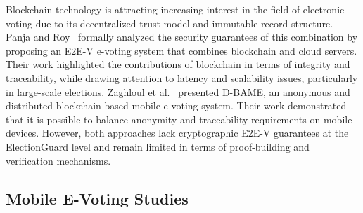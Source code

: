 \documentclass[a4paper,fleqn]{cas-sc}
\begin{document}

Blockchain technology is attracting increasing interest in the field of electronic voting due to its decentralized trust model and immutable record structure. Panja and Roy~\cite{Panja2021} formally analyzed the security guarantees of this combination by proposing an E2E-V e-voting system that combines blockchain and cloud servers. Their work highlighted the contributions of blockchain in terms of integrity and traceability, while drawing attention to latency and scalability issues, particularly in large-scale elections. Zaghloul et al.~\cite{Zaghloul2021} presented D-BAME, an anonymous and distributed blockchain-based mobile e-voting system. Their work demonstrated that it is possible to balance anonymity and traceability requirements on mobile devices. However, both approaches lack cryptographic E2E-V guarantees at the ElectionGuard level and remain limited in terms of proof-building and verification mechanisms.

\subsection{Mobile E-Voting Studies}

\end{document}
